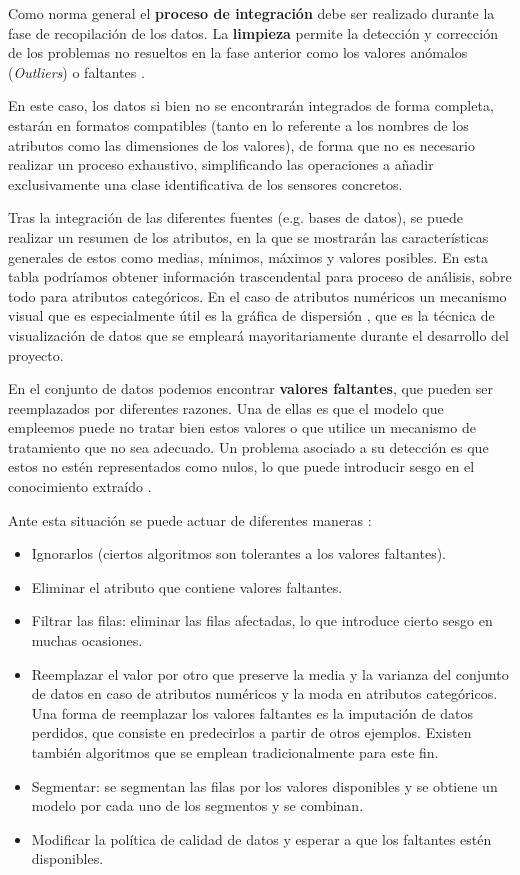 Como norma general el \textbf{proceso de integración} debe ser realizado durante la fase de recopilación de los datos.
La \textbf{limpieza} permite la detección y corrección de los problemas no resueltos en la fase anterior como los valores anómalos (\textit{Outliers}) o faltantes 
\cite{book:hernandez2004}.  

En este caso, los datos si bien no se encontrarán integrados de forma completa, estarán en formatos compatibles (tanto en lo referente
a los nombres de los atributos como las dimensiones de los valores), de forma que no es necesario
realizar un proceso exhaustivo, simplificando las operaciones a añadir exclusivamente una clase identificativa de los sensores concretos.

Tras la integración de las diferentes fuentes (e.g. bases de datos), se puede realizar un resumen de los atributos, en la que
se mostrarán las características generales de estos como medias, mínimos, máximos y valores posibles. 
En esta tabla podríamos obtener información trascendental para proceso de análisis, sobre todo para atributos categóricos.
En el caso de atributos numéricos un mecanismo visual que es especialmente útil es la gráfica de dispersión \cite{book:hernandez2004}, que es la técnica de visualización
de datos que se empleará mayoritariamente durante el desarrollo del proyecto.

En el conjunto de datos podemos encontrar \textbf{valores faltantes}, que pueden ser reemplazados por diferentes razones. Una de ellas es que
el modelo que empleemos puede no tratar bien estos valores o que utilice un mecanismo de tratamiento que no sea adecuado.
Un problema asociado a su detección es que estos no estén representados como nulos, lo que puede introducir sesgo en el conocimiento
extraído \cite{book:hernandez2004}.

Ante esta situación se puede actuar de diferentes maneras \cite{book:hernandez2004}:
\begin{itemize}
    \item Ignorarlos (ciertos algoritmos son tolerantes a los valores faltantes).
    \item Eliminar el atributo que contiene valores faltantes.
    \item Filtrar las filas: eliminar las filas afectadas, lo que introduce cierto sesgo en muchas ocasiones.
    \item Reemplazar el valor por otro que preserve la media y la varianza del conjunto de datos en caso de atributos numéricos y la moda en atributos
        categóricos.
        Una forma de reemplazar los valores faltantes es la imputación de datos perdidos, que consiste en predecirlos a partir de otros ejemplos. Existen también
        algoritmos que se emplean tradicionalmente para este fin.
    \item Segmentar: se segmentan las filas por los valores disponibles y se obtiene un modelo por cada uno de los segmentos y se combinan.
    \item Modificar la política de calidad de datos y esperar a que los faltantes estén disponibles.
\end{itemize}

